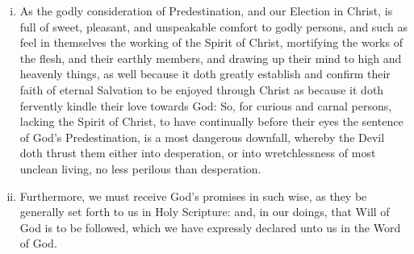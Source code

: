\begin{enumerate}
\begin{enumerate}[i.]
		\item As the godly consideration of Predestination, and our Election in Christ, is full of sweet, pleasant, and unspeakable comfort to godly persons, and such as feel in themselves the working of the Spirit of Christ, mortifying the works of the flesh, and their earthly members, and drawing up their mind to high and heavenly things, as well because it doth greatly establish and confirm their faith of eternal Salvation to be enjoyed through Christ as because it doth fervently kindle their love towards God: So, for curious and carnal persons, lacking the Spirit of Christ, to have continually before their eyes the sentence of God's Predestination, is a most dangerous downfall, whereby the Devil doth thrust them either into desperation, or into wretchlessness of most unclean living, no less perilous than desperation.
		\item Furthermore, we must receive God's promises in such wise, as they be generally set forth to us in Holy Scripture: and, in our doings, that Will of God is to be followed, which we have expressly declared unto us in the Word of God.
	\end{enumerate}
	\end{enumerate}
